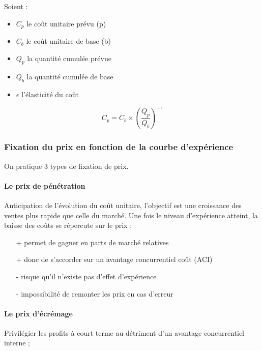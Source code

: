 		\n
		Soient :
		\begin{itemize}
			\item $C_p$ le coût unitaire prévu (p)
			\item $C_b$ le coût unitaire de base (b)
			\item $Q_p$ la quantité cumulée prévue
			\item $Q_b$ la quantité cumulée de base
			\item $ \epsilon$ l'élasticité du coût
		\end{itemize}		
		
		$$C_p = C_b \times (\frac{Q_p}{Q_b})^{-\epsilon}$$
		
		
		
		
			\subsubsection{Fixation du prix en fonction de la courbe d'expérience}
			
			On pratique 3 types de fixation de prix.
			
			
			
			\paragraph{Le prix de pénétration}
			Anticipation de l'évolution du coût unitaire, l'objectif est une croissance des ventes plus rapide que celle du marché. Une fois le niveau d'expérience atteint, la baisse des coûts se répercute sur le prix ;
			
			\begin{itemize}
				\item[+] permet de gagner en parts de marché relatives
				\item[+] donc de s'accorder sur un avantage concurrentiel coût (ACI)
				\item[-] risque qu'il n'existe pas d'effet d'expérience
				\item[-] impossibilité de remonter les prix en cas d'erreur
			\end{itemize}
			
			\paragraph{Le prix d'écrémage}
			Privilégier les profits à court terme au détriment d'un avantage concurrentiel interne ;
			
